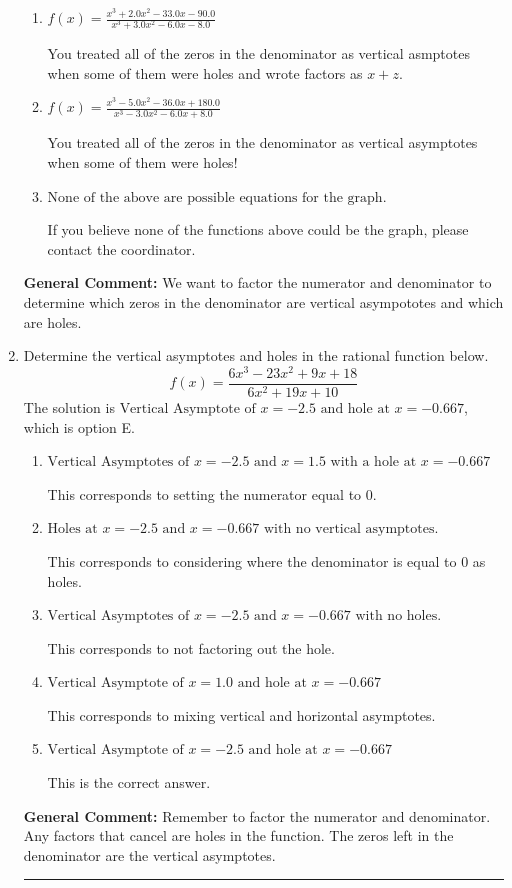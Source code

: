 \documentclass{extbook}[14pt]
\newcommand{\litem}[1]{\item #1

\rule{\textwidth}{0.4pt}}
\begin{document}
\begin{enumerate}
{\begin{enumerate}[label=\Alph*.]
Remember that factors are written as $x-z$. For example, the zero $x=-2$ corresponds to the factor $x-(-2)$.
\item \( f(x)=\frac{x^{3} +2.0 x^{2} -33.0 x -90.0}{x^{3} +3.0 x^{2} -6.0 x -8.0} \)

You treated all of the zeros in the denominator as vertical asmptotes when some of them were holes and wrote factors as $x+z$.
\item \( f(x)=\frac{x^{3} -5.0 x^{2} -36.0 x + 180.0}{x^{3} -3.0 x^{2} -6.0 x + 8.0} \)

You treated all of the zeros in the denominator as vertical asymptotes when some of them were holes!
\item \( \text{None of the above are possible equations for the graph.} \)

If you believe none of the functions above could be the graph, please contact the coordinator.
\end{enumerate}

\textbf{General Comment:} We want to factor the numerator and denominator to determine which zeros in the denominator are vertical asympototes and which are holes.
}
\litem{
Determine the vertical asymptotes and holes in the rational function below.
\[ f(x) = \frac{6x^{3} -23 x^{2} +9 x + 18}{6x^{2} +19 x + 10} \]The solution is \( \text{Vertical Asymptote of } x = -2.5 \text{ and hole at } x = -0.667 \), which is option E.\begin{enumerate}[label=\Alph*.]
\item \( \text{Vertical Asymptotes of } x = -2.5 \text{ and } x = 1.5 \text{ with a hole at } x = -0.667 \)

This corresponds to setting the numerator equal to 0.
\item \( \text{Holes at } x = -2.5 \text{ and } x = -0.667 \text{ with no vertical asymptotes.} \)

This corresponds to considering where the denominator is equal to 0 as holes.
\item \( \text{Vertical Asymptotes of } x = -2.5 \text{ and } x = -0.667 \text{ with no holes.} \)

This corresponds to not factoring out the hole.
\item \( \text{Vertical Asymptote of } x = 1.0 \text{ and hole at } x = -0.667 \)

This corresponds to mixing vertical and horizontal asymptotes.
\item \( \text{Vertical Asymptote of } x = -2.5 \text{ and hole at } x = -0.667 \)

This is the correct answer.
\end{enumerate}

\textbf{General Comment:} Remember to factor the numerator and denominator. Any factors that cancel are holes in the function. The zeros left in the denominator are the vertical asymptotes.
}
\end{enumerate}
\end{document}

